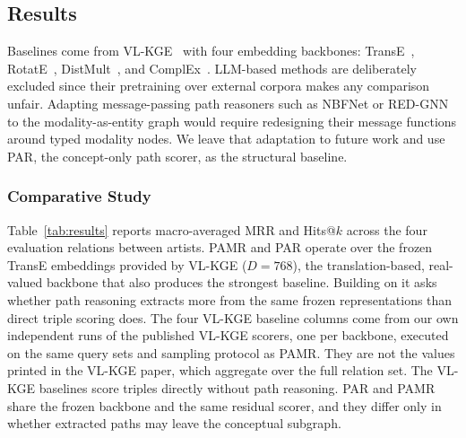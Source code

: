 \documentclass[runningheads]{llncs}
\begin{document}
\subsection{Results}
\label{sec:results}

Baselines come from VL-KGE~\cite{efthymiou2026vlkge} with four embedding
backbones: TransE~\cite{bordes2013translating}, RotatE~\cite{sun2019rotate}, DistMult~\cite{yang2015embedding}, and ComplEx~\cite{trouillon2016complex}. LLM-based methods are
deliberately excluded since their pretraining over external corpora makes
any comparison unfair. Adapting message-passing path reasoners such as
NBFNet or RED-GNN to the modality-as-entity graph would require
redesigning their message functions around typed modality nodes. We leave
that adaptation to future work and use PAR, the concept-only path scorer,
as the structural baseline.

\subsubsection{Comparative Study}

Table~\ref{tab:results} reports macro-averaged MRR and Hits@$k$ across
the four evaluation relations between artists. PAMR and PAR operate over
the frozen TransE embeddings provided by VL-KGE ($D = 768$), the
translation-based, real-valued backbone that also produces the strongest
baseline. Building on it asks whether path reasoning extracts more from
the same frozen representations than direct triple scoring does. The four
VL-KGE baseline columns come from
our own independent runs of the published VL-KGE scorers, one per
backbone, executed on the same query sets and sampling protocol as PAMR.
They are not the values printed in the VL-KGE paper, which aggregate over
the full relation set. The VL-KGE baselines score triples directly
without path reasoning. PAR and PAMR share the frozen backbone and the
same residual scorer, and they differ only in whether extracted paths
may leave the conceptual subgraph.
\end{document}
